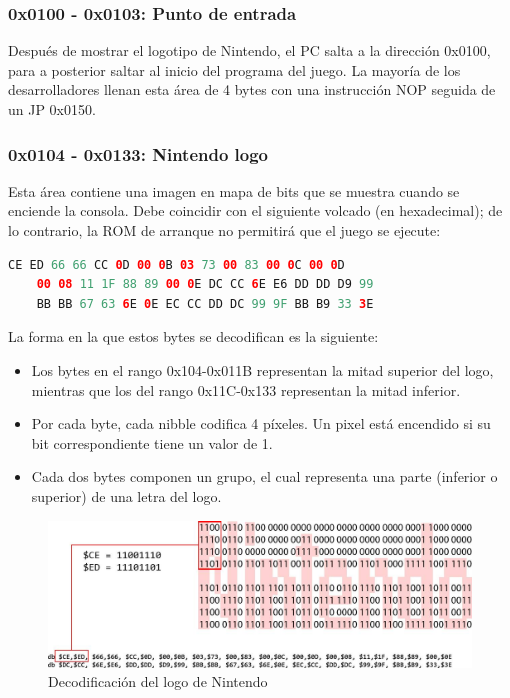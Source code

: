 \subsubsection{0x0100 - 0x0103: Punto de entrada}
Después de mostrar el logotipo de Nintendo, el PC salta a la dirección 0x0100, para a posterior saltar al inicio del programa del juego. La mayoría de los desarrolladores llenan esta área de 4 bytes con una instrucción NOP seguida de un JP 0x0150.

\subsubsection{0x0104 - 0x0133: Nintendo logo}
Esta área contiene una imagen en mapa de bits que se muestra cuando se enciende la consola. Debe coincidir con el siguiente volcado (en hexadecimal); de lo contrario, la ROM de arranque no permitirá que el juego se ejecute:

\begin{lstlisting}[language=Kotlin, caption={Nintendo Logo - Mapa de Bits}, label={code:nintendologobits}]
    CE ED 66 66 CC 0D 00 0B 03 73 00 83 00 0C 00 0D
    00 08 11 1F 88 89 00 0E DC CC 6E E6 DD DD D9 99
    BB BB 67 63 6E 0E EC CC DD DC 99 9F BB B9 33 3E
\end{lstlisting}

La forma en la que estos bytes se decodifican es la siguiente:
\begin{itemize}
    \item Los bytes en el rango 0x104-0x011B representan la mitad superior del logo, mientras que los del rango 0x11C-0x133 representan la mitad inferior.
    \item Por cada byte, cada nibble codifica 4 píxeles. Un pixel está encendido si su bit correspondiente tiene un valor de 1.
    \item Cada dos bytes componen un grupo, el cual representa una parte (inferior o superior) de una letra del logo.
\end{itemize}

\begin{figure}[H]
\centering
\includegraphics[width=1\textwidth]{include/images/dibujado_logo_n.jpg}
\caption{Decodificación del logo de Nintendo}
\label{figure:decodednlogo}
\end{figure}

